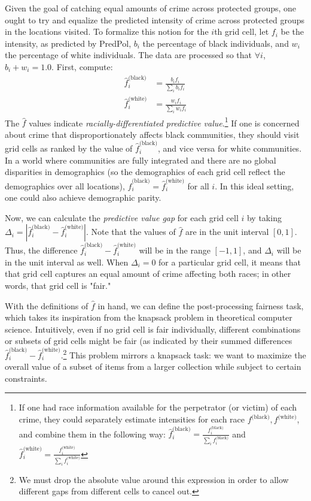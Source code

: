 Given the goal of catching equal amounts of crime across protected groups, one ought to try and equalize the predicted intensity of crime across protected groups in the locations visited. To formalize this notion for the $i$th grid cell, let $f_i$ be the intensity, as predicted by PredPol, $b_i$ the percentage of black individuals, and $w_i$ the percentage of white individuals. The data are processed so that $\forall i$, $b_i + w_i = 1.0$. First, compute:
\begin{align}
\hat{f}^{\text{(black)}}_i &= \frac{b_i f_i}{\sum_i b_i f_i} \label{eq:f_hat1}\\
\hat{f}^{\text{(white)}}_i &= \frac{w_i f_i}{\sum_i w_i f_i} \label{eq:f_hat2}
\end{align}
The $\hat{f}$ values indicate \emph{racially-differentiated predictive
value}.\footnote{If one had race information available for the perpetrator (or victim) of each crime, they could separately estimate intensities for each race $f^{\text{(black)}}, f^{\text{(white)}}$, and combine them in the following way: $
\hat{f}^{\text{(black)}}_i = \frac{f^{\text{(black)}}_i}{\sum_i f^{\text{(black)}}_i}$ and $
\hat{f}^{\text{(white)}}_i = \frac{f^{\text{(white)}}_i}{\sum_i f^{\text{(white)}}_i}
$} If one is concerned about crime that disproportionately affects black communities, they should visit grid cells as ranked by the value of $\hat{f}^{\text{(black)}}_i$, and vice versa for white communities. In a world where communities are fully integrated and there are no global disparities in demographics (so the demographics of each grid cell reflect the demographics over all locations), $\hat{f}^{\text{(black)}}_i = \hat{f}^{\text{(white)}}_i$ for all $i$. In this ideal setting, one could also achieve demographic parity.

Now, we can calculate the \emph{predictive value gap} for each grid cell $i$ by taking $\Delta_i = |\hat{f}^{\text{(black)}}_i - \hat{f}^{\text{(white)}}_i|$.
Note that the values of $\hat{f}$ are in the unit interval $[0, 1]$.
Thus, the difference $\hat{f}^{\text{(black)}}_i - \hat{f}^{\text{(white)}}_i$ will be in the range $[-1, 1]$, and $\Delta_i$ will be in the unit interval as well. When $\Delta_i = 0$ for a particular grid cell, it means that that grid cell captures an equal amount of crime affecting both races; in other words, that grid cell is "fair."

With the definitions of $\hat{f}$ in hand, we can define the post-processing fairness task, which takes its inspiration from the knapsack problem in theoretical computer science. Intuitively, even if no grid cell is fair individually, different combinations or subsets of grid cells might be fair (as indicated by their summed differences $\hat{f}^{\text{(black)}}_i - \hat{f}^{\text{(white)}}_i$.\footnote{We must drop the absolute value around this expression in order to allow different gaps from different cells to cancel out.} This problem mirrors a knapsack task: we want to maximize the overall value of a subset of items from a larger collection while subject to certain constraints.

